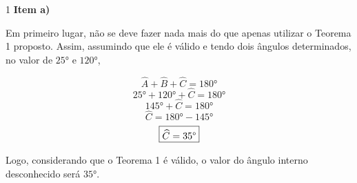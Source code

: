 \begin{solucoes}{1}
    \solucao
\textbf{Item a)}

    Em primeiro lugar, não se deve fazer nada mais do que apenas utilizar o Teorema 1 proposto. Assim, assumindo que ele é válido e tendo dois ângulos determinados, no valor de $25\text{°}$ e $120\text{°}$,
    
\begin{equation*}
    \widehat A+ \widehat B+ \widehat C=180\text{°}
\end{equation*}
\begin{equation*}
    25\text{°}+120\text{°}+\widehat C=180\text{°}
\end{equation*}
\begin{equation*}
    145\text{°}+\widehat C=180\text{°}
\end{equation*}
\begin{equation*}
     \widehat C=180\text{°}-145\text{°}
\end{equation*}
\begin{equation*}
    \fbox{$\widehat C=35\text{°}$}
\end{equation*}

Logo, considerando que o Teorema 1 é válido, o valor do ângulo interno desconhecido será $35\text{°}$.
\end{solucoes}

